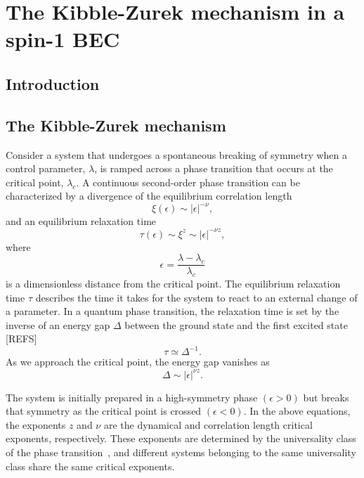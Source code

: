 \chapter{The Kibble-Zurek mechanism in a spin-1 BEC}


\section{Introduction}

\section{The Kibble-Zurek mechanism}\label{sec:the-KZM}
Consider a system that undergoes a spontaneous breaking of symmetry when a
control parameter, $\lambda$, is ramped across a phase transition that occurs
at the critical point, $\lambda_c$.
A continuous second-order phase transition can be characterized by a divergence
of the equilibrium correlation length
\begin{equation}
    \xi(\epsilon) \sim |\epsilon|^{-\nu},
\end{equation}
and an equilibrium relaxation time
\begin{equation}
    \tau(\epsilon) \sim \xi^z \sim |\epsilon|^{-\nu z},
    \label{eq: equil-relax-time}
\end{equation}
where
\begin{equation}
    \epsilon = \frac{\lambda - \lambda_c}{\lambda_c}
\end{equation}
is a dimensionless distance from the critical point.
The equilibrium relaxation time $\tau$ describes the time it takes for the
system to react to an external change of a parameter.
In a quantum phase transition, the relaxation time is set by the inverse of an
energy gap $\Delta$ between the ground state and the first excited state [REFS]
\begin{equation}
    \tau \simeq \Delta^{-1}.
\end{equation}
As we approach the critical point, the energy gap vanishes as
\begin{equation}
    \Delta \sim |\epsilon|^{\nu z}.
\end{equation}


The system is initially prepared in a high-symmetry phase $(\epsilon > 0)$ but 
breaks that symmetry as the critical point is crossed $(\epsilon < 0)$.
In the above equations, the exponents $z$ and $\nu$ are the dynamical and
correlation length critical exponents, respectively.
These exponents are determined by the universality class of the phase
transition~\cite{Sachdev2011}, and different systems belonging to the same
universality class share the same critical exponents. \par

